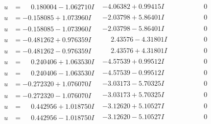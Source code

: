 \documentclass[1p]{elsarticle_modified}
\theoremstyle{definition}
\begin{document}
$$\begin{array}{c|c|c}
\begin{aligned}
u &= \phantom{-}0.180004 - 1.062710 I\end{aligned}
 & -4.06382 + 0.99415 I & \phantom{-0.000000 } 0 \\ \hline\begin{aligned}
u &= -0.158085 + 1.073960 I\end{aligned}
 & -2.03798 + 5.86401 I & \phantom{-0.000000 } 0 \\ \hline\begin{aligned}
u &= -0.158085 - 1.073960 I\end{aligned}
 & -2.03798 - 5.86401 I & \phantom{-0.000000 } 0 \\ \hline\begin{aligned}
u &= -0.481262 + 0.976359 I\end{aligned}
 & \phantom{-}2.43576 - 4.31801 I & \phantom{-0.000000 } 0 \\ \hline\begin{aligned}
u &= -0.481262 - 0.976359 I\end{aligned}
 & \phantom{-}2.43576 + 4.31801 I & \phantom{-0.000000 } 0 \\ \hline\begin{aligned}
u &= \phantom{-}0.240406 + 1.063530 I\end{aligned}
 & -4.57539 + 0.99512 I & \phantom{-0.000000 } 0 \\ \hline\begin{aligned}
u &= \phantom{-}0.240406 - 1.063530 I\end{aligned}
 & -4.57539 - 0.99512 I & \phantom{-0.000000 } 0 \\ \hline\begin{aligned}
u &= -0.272320 + 1.076070 I\end{aligned}
 & -3.03173 - 5.70325 I & \phantom{-0.000000 } 0 \\ \hline\begin{aligned}
u &= -0.272320 - 1.076070 I\end{aligned}
 & -3.03173 + 5.70325 I & \phantom{-0.000000 } 0 \\ \hline\begin{aligned}
u &= \phantom{-}0.442956 + 1.018750 I\end{aligned}
 & -3.12620 + 5.10527 I & \phantom{-0.000000 } 0 \\ \hline\begin{aligned}
u &= \phantom{-}0.442956 - 1.018750 I\end{aligned}
 & -3.12620 - 5.10527 I & \phantom{-0.000000 } 0 \\ \hline\begin{aligned}

\end{aligned}
\end{array}$$
\end{document}
